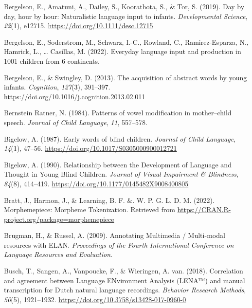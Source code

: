 \documentclass[
  man]{apa6}
\newlength{\cslhangindent}
\newlength{\cslentryspacingunit} %
\newenvironment{CSLReferences}[2] %
 {%
  \setlength{\parindent}{0pt}
  \ifodd #1
  \let\oldpar\par
  \def\par{\hangindent=\cslhangindent\oldpar}
  \fi
  \setlength{\parskip}{#2\cslentryspacingunit}
 }%
 {}
\begin{document}
\begin{CSLReferences}{1}{0}
\leavevmode{}%
Bergelson, E., Amatuni, A., Dailey, S., Koorathota, S., \& Tor, S. (2019). Day by day, hour by hour: {Naturalistic} language input to infants. \emph{Developmental Science}, \emph{22}(1), e12715. \url{https://doi.org/10.1111/desc.12715}

\leavevmode{}%
Bergelson, E., Soderstrom, M., Schwarz, I.-C., Rowland, C., Ramirez-Esparza, N., Hamrick, L., \ldots{} Casillas, M. (2022). Everyday language input and production in 1001 children from 6 continents.

\leavevmode{}%
Bergelson, E., \& Swingley, D. (2013). The acquisition of abstract words by young infants. \emph{Cognition}, \emph{127}(3), 391--397. \url{https://doi.org/10.1016/j.cognition.2013.02.011}

\leavevmode{}%
Bernstein Ratner, N. (1984). Patterns of vowel modification in mother--child speech. \emph{Journal of Child Language}, \emph{11}, 557--578.

\leavevmode{}%
Bigelow, A. (1987). Early words of blind children. \emph{Journal of Child Language}, \emph{14}(1), 47--56. \url{https://doi.org/10.1017/S0305000900012721}

\leavevmode{}%
Bigelow, A. (1990). Relationship between the {Development} of {Language} and {Thought} in {Young} {Blind} {Children}. \emph{Journal of Visual Impairment \& Blindness}, \emph{84}(8), 414--419. \url{https://doi.org/10.1177/0145482X9008400805}

\leavevmode{}%
Bratt, J., Harmon, J., \& Learning, B. F. \&. W. P. G. L. D. M. (2022). Morphemepiece: {Morpheme} {Tokenization}. Retrieved from \url{https://CRAN.R-project.org/package=morphemepiece}

\leavevmode{}%
Brugman, H., \& Russel, A. (2009). Annotating {Multimedia} / {Multi}-modal resources with {ELAN}. \emph{Proceedings of the Fourth International Conference on Language Resources and Evaluation}.

\leavevmode{}%
Busch, T., Sangen, A., Vanpoucke, F., \& Wieringen, A. van. (2018). Correlation and agreement between {Language} {ENvironment} {Analysis} ({LENA}™) and manual transcription for {Dutch} natural language recordings. \emph{Behavior Research Methods}, \emph{50}(5), 1921--1932. \url{https://doi.org/10.3758/s13428-017-0960-0}


\end{CSLReferences}
\end{document}
